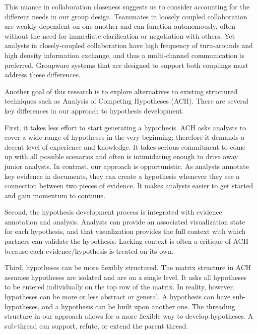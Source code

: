 This nuance in collaboration closeness suggests us to consider accounting for the different needs in our group design. Teammates in loosely coupled collaboration are weakly dependent on one another and can function autonomously, often without the need for immediate clarification or negotiation with others. Yet analysts in closely-coupled collaboration have high frequency of turn-arounds and high density information exchange, and thus a multi-channel communication is preferred. Groupware systems that are designed to support both couplings must address these differences. 



Another goal of this research is to explore alternatives to existing structured techniques such as Analysis of Competing Hypotheses (ACH). There are several key differences in our approach to hypothesis development.

First, it takes less effort to start generating a hypothesis. ACH asks analysts to cover a wide range of hypotheses in the very beginning; therefore it demands a decent level of experience and knowledge. It takes serious commitment to come up with all possible scenarios and often is intimidating enough to drive away junior analysts. In contrast, our approach is opportunistic. As analysts annotate key evidence in documents, they can create a hypothesis whenever they see a connection between two pieces of evidence. It makes analysts easier to get started and gain momentum to continue.

Second, the hypothesis development process is integrated with evidence annotation and analysis. Analysts can provide an associated visualization state for each hypothesis, and that visualization provides the full context with which partners can validate the hypothesis. Lacking context is often a critique of ACH \citep{Gelder2008} because each evidence/hypothesis is treated on its own. 

Third, hypotheses can be more flexibly structured. The matrix structure in ACH assumes hypotheses are isolated and are on a single level. It asks all hypotheses to be entered individually on the top row of the matrix. In reality, however, hypotheses can be more or less abstract or general. A hypothesis can have sub-hypotheses, and a hypothesis can be built upon another one. The threading structure in our approach allows for a more flexible way to develop hypotheses. A sub-thread can support, refute, or extend the parent thread. 

